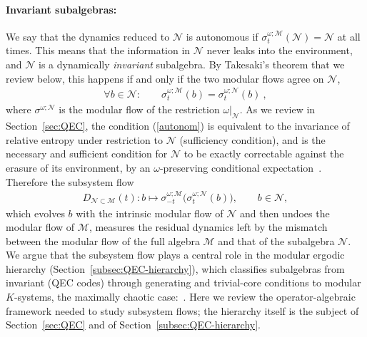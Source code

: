 \documentclass[a4paper,11pt]{article}
\theoremstyle{definition}
\newcommand{\mB}{\mathcal{B}}%
\newcommand{\mN}{\mathcal{N}}
\newcommand{\mH}{\mathcal{H}}
\newcommand{\mM}{\mathcal{M}}
\begin{document}
\paragraph{Invariant subalgebras:}
We say that the dynamics reduced to $\mN$ is autonomous if $\sigma^{\omega;\mM}_t(\mN)=\mN$ at all times. This means that the information in $\mN$ never leaks into the environment, and $\mN$ is a dynamically \emph{invariant} subalgebra. By Takesaki's theorem \cite{Takesaki1972} that we review below, this happens if and only if the two modular flows agree on $\mN$,
\begin{align}\label{autonom}
    \forall b\in\mN:\qquad \sigma^{\omega;\mM}_t(b)=\sigma^{\omega;\mN}_t(b)\ ,
\end{align}
where $\sigma^{\omega;\mN}$ is the modular flow of the restriction $\omega|_{\mN}$. As we review in Section~\ref{sec:QEC}, the condition (\ref{autonom}) is equivalent to the invariance of relative entropy under restriction to $\mN$ (sufficiency condition), and is the necessary and sufficient condition for $\mN$ to be exactly correctable against the erasure of its environment, by an $\omega$-preserving conditional expectation~\cite{furuya2022real}. Therefore the subsystem flow
\begin{align}
   D_{\mN\subset \mM}(t): b\longmapsto\sigma^{\omega;\mM}_{-t}\bigl(\sigma^{\omega;\mN}_t(b)\bigr),\qquad b\in\mN,
    \label{eq:subsystem-flow-preview}
\end{align}
which evolves $b$ with the intrinsic modular flow of $\mN$ and then undoes the modular flow of $\mM$, measures the residual dynamics left by the mismatch between the modular flow of the full algebra $\mM$ and that of the subalgebra $\mN$. 
We argue that the subsystem flow plays a central role in the modular ergodic hierarchy (Section~\ref{subsec:QEC-hierarchy}), which classifies subalgebras from invariant (QEC codes) through generating and trivial-core conditions to modular $K$-systems, the maximally chaotic case:~\cite{ouseph2024local}.
Here we review the operator-algebraic framework needed to study subsystem flows; the hierarchy itself is the subject of Section~\ref{sec:QEC} and of Section~\ref{subsec:QEC-hierarchy}.
\end{document}
